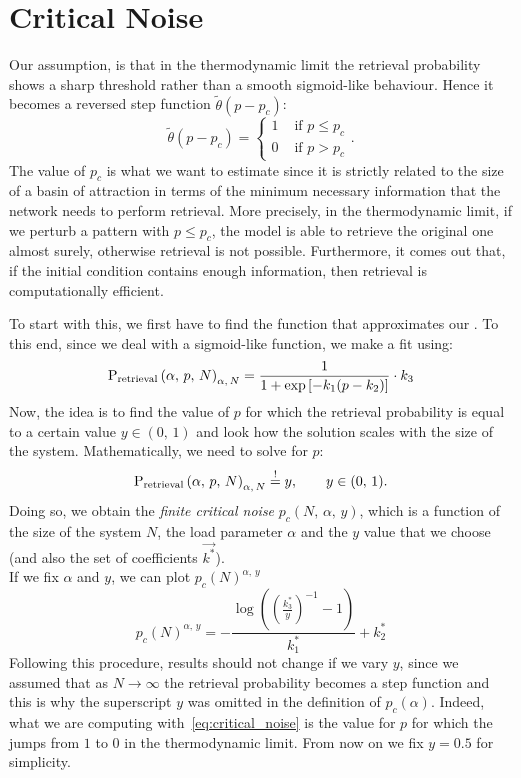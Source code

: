 \documentclass[\rootdir/main.tex]{subfiles}
\begin{document}
\section{Critical Noise}\label{sec:radius:critical_noise}
Our assumption, is that in the thermodynamic limit the retrieval probability shows a sharp threshold rather than a smooth sigmoid-like behaviour. Hence it becomes a reversed step function $\tilde{\theta}(p - p_c)$:
\begin{equation*}
    \tilde{\theta}(p - p_c) = \begin{cases}1 & \text { if } p \leq p_c \\ 0 & \text { if } p > p_c\end{cases}.
\end{equation*}
The value of $p_c$ is what we want to estimate since it is strictly related to the size of a basin of attraction in terms of the minimum necessary information that the network needs to perform retrieval. More precisely, in the thermodynamic limit, if we perturb a pattern with $p \leq p_c$, the model is able to retrieve the original one almost surely, otherwise retrieval is not possible. Furthermore, it comes out that, if the initial condition contains enough information, then retrieval is computationally efficient.

To start with this, we first have to find the function that approximates our . To this end, since we deal with a sigmoid-like function, we make a fit using:
\begin{equation}\label{eq:fit_pret}
     \mathrm{P}_{\text{retrieval}} \left( \alpha, \, p, \, N \right) _{\alpha,\, N} = \frac{1}{1 + \exp \left[ - k_1 (p - k_2) \right]} \cdot k_3
\end{equation}
Now, the idea is to find the value of $p$ for which the retrieval probability is equal to a certain value $y \in (0,\, 1)$ and look how the solution scales with the size of the system. Mathematically, we need to solve for $p$:
\begin{equation}\label{eq:finite_critical_noise}
     \mathrm{P}_{\text{retrieval}} \left( \alpha, \, p, \, N \right) _{\alpha,\, N} \overset{!}{=} y, \qquad y \in (0,\, 1).
\end{equation}
Doing so, we obtain the \emph{finite critical noise} $p_c\left(N,\,\alpha,\,y\right)$, which is a function of the size of the system $N$, the load parameter $\alpha$ and the $y$ value that we choose (and also the set of coefficients $\vec{k^*}$).\\
If we fix $\alpha$ and $y$, we can plot $p_c(N)^{\alpha,\, y}$
\begin{equation}\label{eq:cn:solution_fit}
    p_c(N)^{\alpha,\, y} = - \frac{\log\left(\left(\frac{k_3^*}{y}\right)^{-1} - 1\right)}{k_1^*} + k_2^*
\end{equation}
Following this procedure, results should not change if we vary $y$, since we assumed that as $N \to \infty$ the retrieval probability becomes a step function and this is why the superscript $y$ was omitted in the definition of $p_c\left(\alpha\right)$. Indeed, what we are computing with~\cref{eq:critical_noise} is the value for $p$ for which the  jumps from $1$ to $0$ in the thermodynamic limit. From now on we fix $y = 0.5$ for simplicity.
\end{document}
